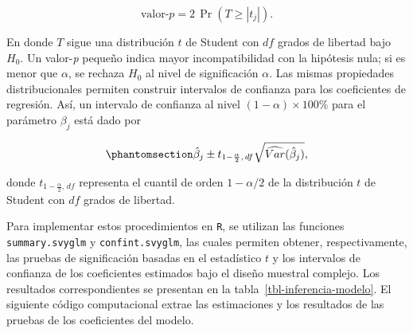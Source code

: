 \documentclass[
  spanish,
  11pt,
  letterpaper,
  oneside,
  open=any]{scrbook}
\newenvironment{Shaded}{\begin{snugshade}}{\end{snugshade}}
\newcommand{\AttributeTok}[1]{\textcolor[rgb]{0.40,0.45,0.13}{#1}}
\newcommand{\ConstantTok}[1]{\textcolor[rgb]{0.56,0.35,0.01}{#1}}
\newcommand{\FunctionTok}[1]{\textcolor[rgb]{0.28,0.35,0.67}{#1}}
\newcommand{\NormalTok}[1]{\textcolor[rgb]{0.00,0.23,0.31}{#1}}
\newcommand{\OtherTok}[1]{\textcolor[rgb]{0.00,0.23,0.31}{#1}}
\newcommand{\SpecialCharTok}[1]{\textcolor[rgb]{0.37,0.37,0.37}{#1}}
\newcommand{\StringTok}[1]{\textcolor[rgb]{0.13,0.47,0.30}{#1}}
\begin{document}
\[
\text{valor-}p
=
2\,\Pr\!\left(T\geq |t_j|\right).
\]

En donde \(T\) sigue una distribución \(t\) de Student con \(df\) grados
de libertad bajo \(H_0\). Un valor-\emph{p} pequeño indica mayor
incompatibilidad con la hipótesis nula; si es menor que \(\alpha\), se
rechaza \(H_0\) al nivel de significación \(\alpha\). Las mismas
propiedades distribucionales permiten construir intervalos de confianza
para los coeficientes de regresión. Así, un intervalo de confianza al
nivel \((1-\alpha)\times100\%\) para el parámetro \(\beta_j\) está dado
por

\begin{equation}\protect\phantomsection\label{eq-intervalo-coeficiente-regresion}{
\hat{\beta}_{j}
\pm
t_{1-\frac{\alpha}{2},\,df}
\sqrt{\widehat{Var}(\hat{\beta}_{j})},
}\end{equation}

donde \(t_{1-\frac{\alpha}{2},\,df}\) representa el cuantil de orden
\(1-\alpha/2\) de la distribución \(t\) de Student con \(df\) grados de
libertad.

Para implementar estos procedimientos en \texttt{R}, se utilizan las
funciones \texttt{summary.svyglm} y \texttt{confint.svyglm}, las cuales
permiten obtener, respectivamente, las pruebas de significación basadas
en el estadístico \(t\) y los intervalos de confianza de los
coeficientes estimados bajo el diseño muestral complejo. Los resultados
correspondientes se presentan en la tabla~\ref{tbl-inferencia-modelo}.
El siguiente código computacional extrae las estimaciones y los
resultados de las pruebas de los coeficientes del modelo.

\begin{Shaded}
\end{Shaded}
\end{document}
